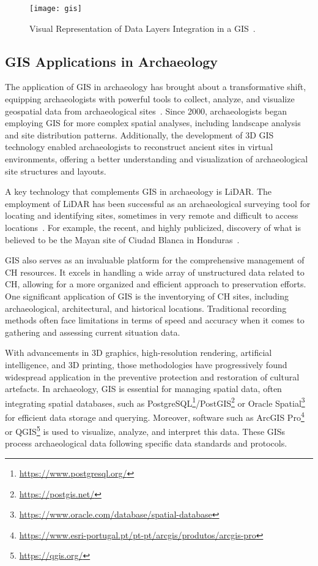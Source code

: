 \begin{figure}[h!]
    \centering
    \texttt{[image: gis]}
    \caption{Visual Representation of Data Layers Integration in a \gls{GIS}~\cite{gao_data_layers}.}
    \label{fig:gis}
\end{figure}

\subsection{GIS Applications in Archaeology}
\label{sub:gis_archeology}

The application of \gls{GIS} in archaeology has brought about a transformative shift, equipping archaeologists with powerful tools to collect, analyze, 
and visualize geospatial data from archaeological sites~\cite{yao2023overview}. Since 2000, archaeologists began employing \gls{GIS} for more complex spatial analyses, including landscape analysis and site distribution 
patterns. Additionally, the development of \gls{3D} \gls{GIS} technology enabled archaeologists to reconstruct ancient sites in virtual environments, offering a 
better understanding and visualization of archaeological site structures and layouts.

A key technology that complements \gls{GIS} in archaeology is \gls{LiDAR}. 
The employment of \gls{LiDAR} has been successful as an archaeological surveying tool for locating and identifying
sites, sometimes in very remote and difficult to access locations~\cite{article_lidar}. For example, the recent, and highly publicized, 
discovery of what is believed to be the Mayan site of Ciudad Blanca in Honduras~\cite{Tolley2012}.

\gls{GIS} also serves as an invaluable platform for the comprehensive management of \gls{CH} resources. It excels in handling a wide array of
unstructured data related to \gls{CH}, allowing for a more organized and efficient approach to preservation efforts. One significant 
application of \gls{GIS} is the inventorying of \gls{CH} sites, including archaeological, architectural, and historical locations. Traditional recording methods often face limitations in terms of speed and accuracy when
it comes to gathering and assessing current situation data.

With advancements in \gls{3D} graphics, high-resolution rendering, artificial intelligence, and \gls{3D} printing, those methodologies have progressively found widespread application in the preventive protection and restoration of cultural artefacts. 
In archaeology, \gls{GIS} is essential for managing spatial data, often integrating spatial databases, such as PostgreSQL\footnote{\url{https://www.postgresql.org/}}/PostGIS\footnote{\url{https://postgis.net/}} or Oracle Spatial\footnote{\url{https://www.oracle.com/database/spatial-database}} for efficient data storage and querying.
Moreover, software such as ArcGIS Pro\footnote{\url{https://www.esri-portugal.pt/pt-pt/arcgis/produtos/arcgis-pro}} or QGIS\footnote{\url{https://qgis.org/}} is used to visualize, analyze, and interpret this data. These \glspl{GIS} process archaeological data following specific data standards and protocols.

